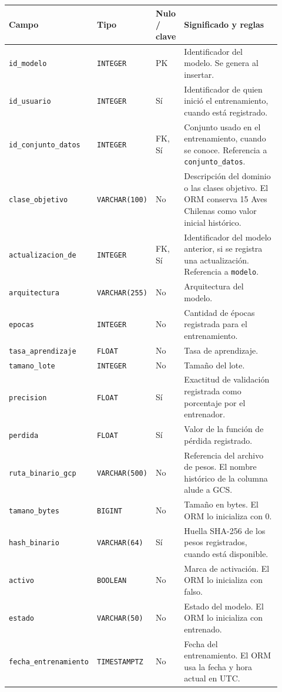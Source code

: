 \noindent
\begin{tabular}{@{}p{0.30\linewidth}p{0.16\linewidth}p{0.10\linewidth}p{0.36\linewidth}@{}}
\hline
\textbf{Campo} & \textbf{Tipo} & \textbf{Nulo / clave} & \textbf{Significado y reglas} \\
\hline
\texttt{id\_\allowbreak{}modelo} & \texttt{INTEGER} & PK & Identificador del modelo. Se genera al insertar. \\
\texttt{id\_\allowbreak{}usuario} & \texttt{INTEGER} & Sí & Identificador de quien inició el entrenamiento, cuando está registrado. \\
\texttt{id\_\allowbreak{}conjunto\_\allowbreak{}datos} & \texttt{INTEGER} & FK, Sí & Conjunto usado en el entrenamiento, cuando se conoce. Referencia a \texttt{conjunto\_\allowbreak{}datos}. \\
\texttt{clase\_\allowbreak{}objetivo} & \texttt{VARCHAR(100)} & No & Descripción del dominio o las clases objetivo. El ORM conserva \guillemotleft{}15 Aves Chilenas\guillemotright{} como valor inicial histórico. \\
\texttt{actualizacion\_\allowbreak{}de} & \texttt{INTEGER} & FK, Sí & Identificador del modelo anterior, si se registra una actualización. Referencia a \texttt{modelo}. \\
\texttt{arquitectura} & \texttt{VARCHAR(255)} & No & Arquitectura del modelo. \\
\texttt{epocas} & \texttt{INTEGER} & No & Cantidad de épocas registrada para el entrenamiento. \\
\texttt{tasa\_\allowbreak{}aprendizaje} & \texttt{FLOAT} & No & Tasa de aprendizaje. \\
\texttt{tamano\_\allowbreak{}lote} & \texttt{INTEGER} & No & Tamaño del lote. \\
\texttt{precision} & \texttt{FLOAT} & Sí & Exactitud de validación registrada como porcentaje por el entrenador. \\
\texttt{perdida} & \texttt{FLOAT} & Sí & Valor de la función de pérdida registrado. \\
\texttt{ruta\_\allowbreak{}binario\_\allowbreak{}gcp} & \texttt{VARCHAR(500)} & No & Referencia del archivo de pesos. El nombre histórico de la columna alude a GCS. \\
\texttt{tamano\_\allowbreak{}bytes} & \texttt{BIGINT} & No & Tamaño en bytes. El ORM lo inicializa con 0. \\
\texttt{hash\_\allowbreak{}binario} & \texttt{VARCHAR(64)} & Sí & Huella SHA-256 de los pesos registrados, cuando está disponible. \\
\texttt{activo} & \texttt{BOOLEAN} & No & Marca de activación. El ORM lo inicializa con falso. \\
\texttt{estado} & \texttt{VARCHAR(50)} & No & Estado del modelo. El ORM lo inicializa con entrenado. \\
\texttt{fecha\_\allowbreak{}entrenamiento} & \texttt{TIMESTAMPTZ} & No & Fecha del entrenamiento. El ORM usa la fecha y hora actual en UTC. \\
\hline
\end{tabular}

